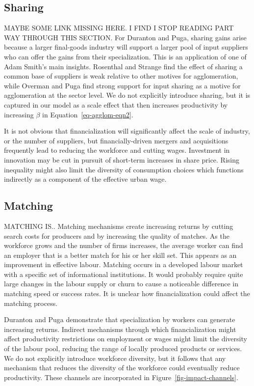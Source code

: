 \subsection{Sharing}
MAYBE SOME LINK MISSING HERE. I FIND I STOP READING PART WAY THROUGH THIS SECTION.
For Duranton and Puga, sharing gains arise because a larger final-goods industry will support a larger pool of input suppliers who can offer the gains from their specialization. This is an application of one of Adam Smith's main insights. Rosenthal and Strange \cite{rosenthalEvidenceNatureSources2004} find the effect of sharing a common base of suppliers is weak relative to other motives for agglomeration, while  Overman and Puga \cite{overmanLaborPoolingSource2010} find strong support for input sharing as a motive for agglomeration at the sector level. We do not explicitly introduce sharing, but it is captured in our model as a scale effect that then increases productivity by increasing $\beta$ in Equation~\ref{eq-agglom-eqn2}. 

It is not obvious that financialization will significantly affect the scale of industry, or the number of suppliers, but financially-driven mergers and acquisitions frequently lead to reducing the workforce and cutting wages. Investment in innovation may be cut in pursuit of short-term increases in share price.  Rising inequality might also limit the diversity of consumption choices which functions indirectly as a component of the effective urban wage. 
 
\subsection{Matching}
MATCHING IS.. 
Matching mechanisms create increasing returns by cutting search costs for producers and by increasing the quality of matches. As the workforce grows and the number of firms increases, the average worker can find an employer that is a better match for his or her skill set. This appears as an improvement in effective labour. Matching occurs in a developed labour market with a specific set of informational institutions. It would probably require quite large changes in the labour supply or churn to cause a noticeable difference in matching speed or success rates. It is unclear how financialization could affect the matching process.

Duranton and Puga demonstrate that specialization by workers can generate increasing returns. Indirect mechanisms through which financialization might affect productivity restrictions on employment or wages might limit the diversity of the labour pool, reducing the range of locally produced products or services.  We do not explicitly introduce workforce diversity, but it follows that any mechanism that reduces the diversity of the workforce could eventually reduce productivity. These channels are incorporated in Figure~\ref{fig-impact-channels}.
 
